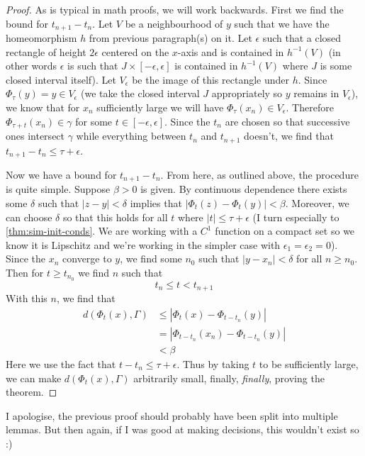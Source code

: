 \begin{proof}
As is typical in math proofs, we will work backwards. First we find the bound for $t_{n + 1} - t_n$. Let $V$ be a neighbourhood of $y$ such that we have the homeomorphism $h$ from previous paragraph(s) on it. Let $\epsilon$ such that a closed rectangle of height $2 \epsilon$ centered on the $x$-axis and is contained in $h^{-1}(V)$ (in other words $\epsilon$ is such that $J \times [-\epsilon, \epsilon]$ is contained in $h^{-1}(V)$ where $J$ is some closed interval itself). Let $V_{\epsilon}$ be the image of this rectangle under $h$. Since $\Phi_\tau(y) = y \in V_\epsilon$ (we take the closed interval $J$ appropriately so $y$ remains in $V_\epsilon$), we know that for $x_n$ sufficiently large we will have $\Phi_\tau(x_n) \in V_\epsilon$. Therefore $\Phi_{\tau + t}(x_n) \in \gamma$ for some $t \in [-\epsilon, \epsilon]$. Since the $t_n$ are chosen so that successive ones intersect $\gamma$ while everything between $t_{n}$ and $t_{n + 1}$ doesn't, we find that $t_{n + 1} - t_n \leq \tau + \epsilon$. 

Now we have a bound for $t_{n + 1} - t_n$. From here, as outlined above, the procedure is quite simple. Suppose $\beta > 0$ is given. By continuous dependence there exists some $\delta$ such that $\left|z - y\right| < \delta$ implies that $\left| \Phi_{t}(z) - \Phi_t(y) \right| < \beta$. Moreover, we can choose $\delta$ so that this holds for all $t$ where $|t| \leq \tau + \epsilon$ (I turn especially to \autoref{thm:sim-init-conds}. We are working with a $C^1$ function on a compact set so we know it is Lipschitz and we're working in the simpler case with $\epsilon_1 = \epsilon_2 = 0$). Since the $x_n$ converge to $y$, we find some $n_0$ such that $|y - x_n| < \delta$ for all $n \geq n_0$. Then for $t \geq t_{n_0}$ we find $n$ such that
$$ t_n \leq t < t_{n + 1} $$
With this $n$, we find that
\begin{align*}
    d(\Phi_{t}(x), \Gamma) &\leq \left| \Phi_t(x) - \Phi_{t - t_n}(y) \right|\\
    &= \left| \Phi_{t - t_n}(x_n) - \Phi_{t - t_n}(y) \right|\\
    &< \beta
\end{align*}
Here we use the fact that $t - t_n \leq \tau + \epsilon$. Thus by taking $t$ to be sufficiently large, we can make $d(\Phi_t(x), \Gamma)$ arbitrarily small, finally, \textit{finally}, proving the theorem.
\end{proof}

I apologise, the previous proof should probably have been split into multiple lemmas. But then again, if I was good at making decisions, this wouldn't exist so :)
